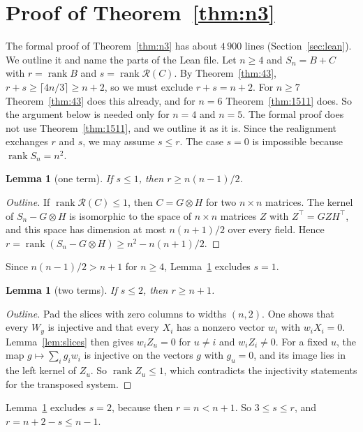 \documentclass[11pt]{amsart}
\newtheorem{lemma}[theorem]{Lemma}
\theoremstyle{remark}
\newcommand{\rk}{\operatorname{rank}}
\newcommand{\R}{\mathcal{R}}
\begin{document}
\section{Proof of Theorem~\ref{thm:n3}}\label{sec:n3}

The formal proof of Theorem~\ref{thm:n3} has about $4\,900$ lines (Section~\ref{sec:lean}). We outline it
and name the parts of the Lean file. Let $n\ge4$ and $S_n=B+C$ with $r=\rk B$ and $s=\rk\R(C)$. By
Theorem~\ref{thm:43}, $r+s\ge\lceil4n/3\rceil\ge n+2$, so we must exclude $r+s=n+2$. For $n\ge7$
Theorem~\ref{thm:43} does this already, and for $n=6$ Theorem~\ref{thm:1511} does. So the argument below
is needed only for $n=4$ and $n=5$. The formal proof does not use Theorem~\ref{thm:1511}, and we outline it
as it is. Since the realignment
exchanges $r$ and $s$, we may assume $s\le r$. The case $s=0$ is impossible because $\rk S_n=n^2$.

\begin{lemma}[one term]\label{lem:one}
If $s\le1$, then $r\ge n(n-1)/2$.
\end{lemma}

\begin{proof}[Outline]
If $\rk\R(C)\le1$, then $C=G\otimes H$ for two $n\times n$ matrices. The kernel of $S_n-G\otimes H$ is
isomorphic to the space of $n\times n$ matrices $Z$ with $Z^{\top}=GZH^{\top}$, and this space has dimension at
most $n(n+1)/2$ over every field. Hence $r=\rk(S_n-G\otimes H)\ge n^2-n(n+1)/2$.
\end{proof}

Since $n(n-1)/2>n+1$ for $n\ge4$, Lemma~\ref{lem:one} excludes $s=1$.

\begin{lemma}[two terms]\label{lem:two}
If $s\le2$, then $r\ge n+1$.
\end{lemma}

\begin{proof}[Outline]
Pad the slices with zero columns to widths $(n,2)$. One shows that every $W_y$ is injective and that every
$X_i$ has a nonzero vector $w_i$ with $w_iX_i=0$. Lemma~\ref{lem:slices} then gives $w_iZ_u=0$ for $u\ne i$
and $w_iZ_i\ne0$. For a fixed $u$, the map $g\mapsto\sum_ig_iw_i$ is injective on the vectors $g$ with
$g_u=0$, and its image lies in the left kernel of $Z_u$. So $\rk Z_u\le1$, which contradicts the injectivity
statements for the transposed system.
\end{proof}

Lemma~\ref{lem:two} excludes $s=2$, because then $r=n<n+1$. So $3\le s\le r$, and $r=n+2-s\le n-1$.
\end{document}
